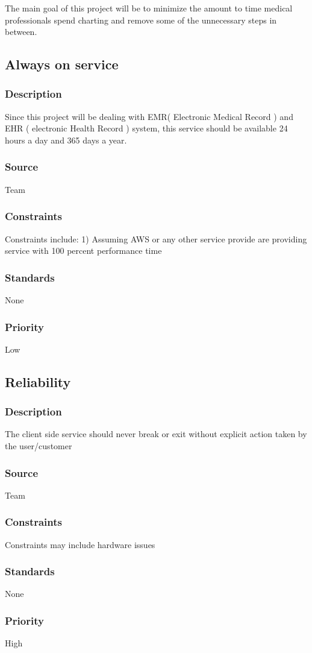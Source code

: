 The main goal of this project will be to minimize the amount to time medical professionals spend charting and remove some of the unnecessary steps in between. 

\subsection{Always on service}
\subsubsection{Description}
Since this project will be dealing with EMR( Electronic Medical Record ) and EHR ( electronic Health Record ) system, this service should be available 24 hours a day and 365 days a year.
\subsubsection{Source}
Team
\subsubsection{Constraints}
Constraints include: 
1) Assuming AWS or any other service provide are providing service with 100 percent performance time
\subsubsection{Standards}
None
\subsubsection{Priority}
Low

\subsection{Reliability}
\subsubsection{Description}
The client side service should never break or exit without explicit action taken by the user/customer
\subsubsection{Source}
Team
\subsubsection{Constraints}
Constraints may include hardware issues
\subsubsection{Standards}
None
\subsubsection{Priority}
High